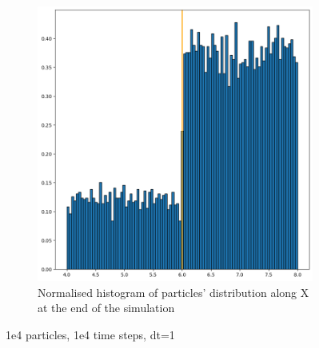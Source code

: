 \documentclass{article}
\begin{document}
\begin{figure}[htbp]
\begin{subfigure}[b]{0.45\textwidth}
        \includegraphics[width=\textwidth]{images/histDl01Dr001Rl0Rr0.png}
        \caption{Normalised histogram of particles' distribution along X at the end of the simulation}
    \end{subfigure}
    \caption{1e4 particles, 1e4 time steps, dt=1}
    \label{fig:MatrixDiffusion2}
\end{figure}

\FloatBarrier  %
\end{document}
